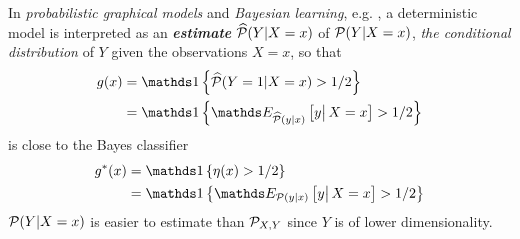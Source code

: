 \documentclass[11pt]{article}
\begin{document}
\begin{itemize}
\begin{definition}
\begin{itemize}
In \emph{probabilistic graphical models} and \emph{Bayesian learning}, e.g. \citep{koller2009probabilistic, murphy2012machine}, a deterministic model is interpreted as an \emph{\textbf{estimate}} $\widehat{{\mathcal P}}(Y| X=x)$ of ${\mathcal P}(Y| X=x)$, \emph{the conditional distribution} of $Y$ given the observations $X=x$, so that  
\begin{align*}
g(x) &= \ind{\widehat{\cP}(Y=1| X=x)>1/2}\\
&=  \ind{\E{\widehat{\cP}(y|x)}{y\big|\,X=x}>1/2}
\end{align*} is close to the Bayes classifier
\begin{align*}
g^{*}(x)&= \ind{\eta(x)>1/2}\\
&=\ind{\E{\cP(y|x)}{y\big|\,X=x}>1/2}
\end{align*} ${\mathcal P}(Y| X=x)$ is easier to estimate than ${\mathcal P}_{X,Y}$ since $Y$ is of lower dimensionality.
\end{itemize}
\end{definition}


\end{itemize}
\end{document}
